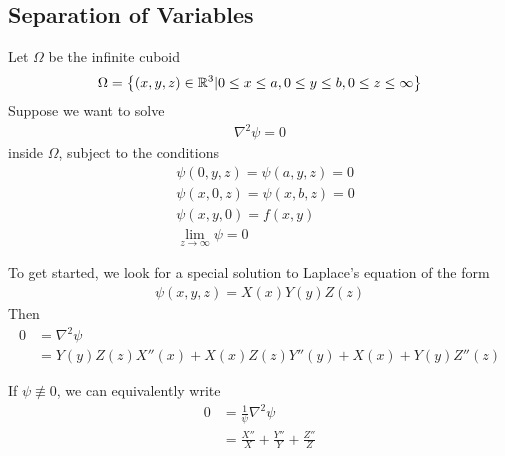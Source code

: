 \documentclass[a4paper]{article}
\begin{document}
\subsection{Separation of Variables}
Let $\Omega$ be the infinite cuboid
\begin{equation*}
\begin{aligned}
\Omega = \left\{\left(x,y,z\right) \in \mathbb{R}^3 | 0\leq x\leq a,0\leq y\leq b,0\leq z\leq \infty\right\}
\end{aligned}
\end{equation*}
Suppose we want to solve
\begin{equation*}
\begin{aligned}
\nabla^2 \psi=0
\end{aligned}
\end{equation*}
inside $\Omega$, subject to the conditions
\begin{equation*}
\begin{aligned}
&\psi\left(0,y,z\right)=\psi\left(a,y,z\right)=0\\
&\psi\left(x,0,z\right)=\psi\left(x,b,z\right)=0\\
&\psi\left(x,y,0\right) = f\left(x,y\right)\\
&\lim_{z\to\infty} \psi = 0
\end{aligned}
\end{equation*}

To get started, we look for a special solution to Laplace's equation of the form
\begin{equation*}
\begin{aligned}
\psi\left(x,y,z\right) = X\left(x\right)Y\left(y\right)Z\left(z\right)
\end{aligned}
\end{equation*}
Then
\begin{equation*}
\begin{aligned}
0 &= \nabla^2 \psi\\
&= Y\left(y\right)Z\left(z\right)X''\left(x\right) + X\left(x\right)Z\left(z\right)Y''\left(y\right)+X\left(x\right)+Y\left(y\right)Z''\left(z\right)
\end{aligned}
\end{equation*}

If $\psi \not\equiv 0$, we can equivalently write
\begin{equation*}
\begin{aligned}
0 &= \frac{1}{\psi} \nabla^2 \psi\\
&= \frac{X''}{X} + \frac{Y''}{Y} + \frac{Z''}{Z}
\end{aligned}
\end{equation*}
\end{document}
